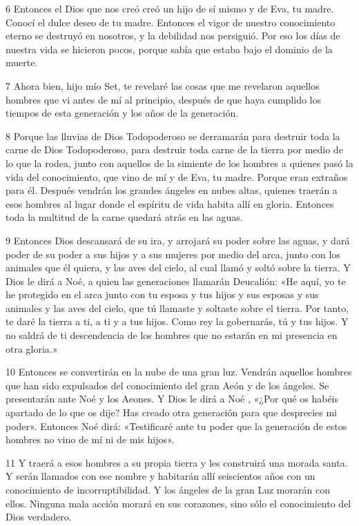 \par 6 Entonces el Dios que nos creó creó un hijo de sí mismo y de Eva, tu madre. Conocí el dulce deseo de tu madre. Entonces el vigor de nuestro conocimiento eterno se destruyó en nosotros, y la debilidad nos persiguió. Por eso los días de nuestra vida se hicieron pocos, porque sabía que estaba bajo el dominio de la muerte.

\par 7 Ahora bien, hijo mío Set, te revelaré las cosas que me revelaron aquellos hombres que vi antes de mí al principio, después de que haya cumplido los tiempos de esta generación y los años de la generación.

\par 8 Porque las lluvias de Dios Todopoderoso se derramarán para destruir toda la carne de Dios Todopoderoso, para destruir toda carne de la tierra por medio de lo que la rodea, junto con aquellos de la simiente de los hombres a quienes pasó la vida del conocimiento, que vino de mí y de Eva, tu madre. Porque eran extraños para él. Después vendrán los grandes ángeles en nubes altas, quienes traerán a esos hombres al lugar donde el espíritu de vida habita allí en gloria. Entonces toda la multitud de la carne quedará atrás en las aguas.

\par 9 Entonces Dios descansará de su ira, y arrojará su poder sobre las aguas, y dará poder de su poder a sus hijos y a sus mujeres por medio del arca, junto con los animales que él quiera, y las aves del cielo, al cual llamó y soltó sobre la tierra. Y Dios le dirá a Noé, a quien las generaciones llamarán Deucalión: «He aquí, yo te he protegido en el arca junto con tu esposa y tus hijos y sus esposas y sus animales y las aves del cielo, que tú llamaste y soltaste sobre el tierra. Por tanto, te daré la tierra a ti, a ti y a tus hijos. Como rey la gobernarás, tú y tus hijos. Y no saldrá de ti descendencia de los hombres que no estarán en mi presencia en otra gloria.»

\par 10 Entonces se convertirán en la nube de una gran luz. Vendrán aquellos hombres que han sido expulsados ​​del conocimiento del gran Aeón y de los ángeles. Se presentarán ante Noé y los Aeones. Y Dios le dirá a Noé , «¿Por qué os habéis apartado de lo que os dije? Has creado otra generación para que desprecies mi poder». Entonces Noé dirá: «Testificaré ante tu poder que la generación de estos hombres no vino de mí ni de mis hijos».

\par 11 Y traerá a esos hombres a su propia tierra y les construirá una morada santa. Y serán llamados con ese nombre y habitarán allí seiscientos años con un conocimiento de incorruptibilidad. Y los ángeles de la gran Luz morarán con ellos. Ninguna mala acción morará en sus corazones, sino sólo el conocimiento del Dios verdadero.

